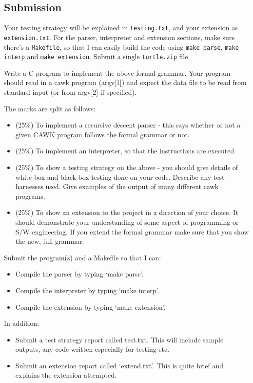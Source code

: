 \begin{exercise}
\subsection*{Submission}
Your testing strategy will be explained in \verb^testing.txt^, and your extension
as \verb^extension.txt^. For the parser, interpreter and extension sections, make
sure there's a \verb^Makefile^, so that I can easily build the code using \verb^make parse^,
\verb^make interp^ and \verb^make extension^. Submit a single \verb^turtle.zip^ file.

\end{exercise}





\begin{exercise}
Write a C program to implement the above formal grammar. Your program
should read in a cawk program (argv[1]) and expect the data
file to be read from standard input (or from argv[2] if specified).

The marks are split as follows:
\begin{itemize}
\item (25\%) To implement a recursive descent parser - this says
whether or not a given CAWK program follows the formal grammar or not.

\item (25\%) To implement an interpreter, so that the instructions are
executed.

\item (25\%) To show a testing strategy on the above -
you should give details of
white-box and black-box testing done on your code. Describe any
test-harnesses used. Give examples of the output of many different
cawk programs.

\item (25\%) To show an extension to the project in a direction of
your choice. It should demonstrate your understanding of some aspect
of programming or S/W engineering. If you extend the formal grammar
make sure that you show the new, full grammar.
\end{itemize}

Submit the program(s) and a Makefile so that I can:

\begin{itemize}
\item Compile the parser by typing `make parse'.
\item Compile the interpreter by typing `make interp'.
\item Compile the extension by typing `make extension'.
\end{itemize}

In addition:
\begin{itemize}
\item Submit a test strategy report called test.txt. This will include
sample outputs, any code written especially for testing etc.
\item Submit an extension report called `extend.txt'. This is quite
brief and explains the extension attempted.
\end{itemize}

\end{exercise}

